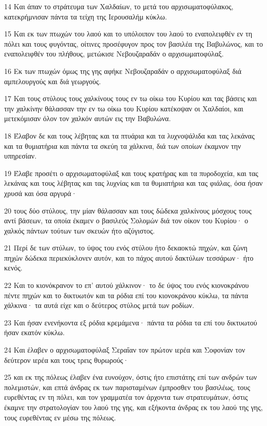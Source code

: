 \par 14 Και άπαν το στράτευμα των Χαλδαίων, το μετά του αρχισωματοφύλακος, κατεκρήμνισαν πάντα τα τείχη της Ιερουσαλήμ κύκλω.
\par 15 Και εκ των πτωχών του λαού και το υπόλοιπον του λαού το εναπολειφθέν εν τη πόλει και τους φυγόντας, οίτινες προσέφυγον προς τον βασιλέα της Βαβυλώνος, και το εναπολειφθέν του πλήθους, μετώκισε Νεβουζαραδάν ο αρχισωματοφύλαξ.
\par 16 Εκ των πτωχών όμως της γης αφήκε Νεβουζαραδάν ο αρχισωματοφύλαξ διά αμπελουργούς και διά γεωργούς.
\par 17 Και τους στύλους τους χαλκίνους τους εν τω οίκω του Κυρίου και τας βάσεις και την χαλκίνην θάλασσαν την εν τω οίκω του Κυρίου κατέκοψαν οι Χαλδαίοι, και μετεκόμισαν όλον τον χαλκόν αυτών εις την Βαβυλώνα.
\par 18 Έλαβον δε και τους λέβητας και τα πτυάρια και τα λυχνοψάλιδα και τας λεκάνας και τα θυμιατήρια και πάντα τα σκεύη τα χάλκινα, διά των οποίων έκαμνον την υπηρεσίαν.
\par 19 Έλαβε προσέτι ο αρχισωματοφύλαξ και τους κρατήρας και τα πυροδοχεία, και τας λεκάνας και τους λέβητας και τας λυχνίας και τα θυμιατήρια και τας φιάλας, όσα ήσαν χρυσά και όσα αργυρά·
\par 20 τους δύο στύλους, την μίαν θάλασσαν και τους δώδεκα χαλκίνους μόσχους τους αντί βάσεων, τα οποία έκαμεν ο βασιλεύς Σολομών διά τον οίκον του Κυρίου· ο χαλκός πάντων τούτων των σκευών ήτο αζύγιστος.
\par 21 Περί δε των στύλων, το ύψος του ενός στύλου ήτο δεκαοκτώ πηχών, και ζώνη πηχών δώδεκα περιεκύκλονεν αυτόν, και το πάχος αυτού δακτύλων τεσσάρων· ήτο κενός.
\par 22 Και το κιονόκρανον το επ' αυτού χάλκινον· το δε ύψος του ενός κιονοκράνου πέντε πηχών και το δικτυωτόν και τα ρόδια επί του κιονοκράνου κύκλω, τα πάντα χάλκινα· τα αυτά είχε και ο δεύτερος στύλος μετά των ροδίων.
\par 23 Και ήσαν ενενήκοντα εξ ρόδια κρεμάμενα· πάντα τα ρόδια τα επί του δικτυωτού ήσαν εκατόν κύκλω.
\par 24 Και έλαβεν ο αρχισωματοφύλαξ Σεραΐαν τον πρώτον ιερέα και Σοφονίαν τον δεύτερον ιερέα και τους τρεις θυρωρούς·
\par 25 και εκ της πόλεως έλαβεν ένα ευνούχον, όστις ήτο επιστάτης επί των ανδρών των πολεμιστών, και επτά άνδρας εκ των παρισταμένων έμπροσθεν του βασιλέως, τους ευρεθέντας εν τη πόλει, και τον γραμματέα τον άρχοντα των στρατευμάτων, όστις έκαμνε την στρατολογίαν του λαού της γης, και εξήκοντα άνδρας εκ του λαού της γης, τους ευρεθέντας εν μέσω της πόλεως.

